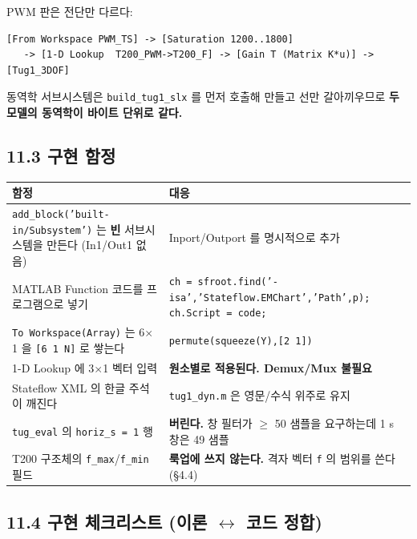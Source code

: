 \documentclass[10pt,a4paper]{article}
\begin{document}
PWM 판은 전단만 다르다:

\begin{Verbatim}[fontsize=\small,frame=single,framesep=2.2mm,rulecolor=\color{black!35}]
[From Workspace PWM_TS] -> [Saturation 1200..1800]
   -> [1-D Lookup  T200_PWM->T200_F] -> [Gain T (Matrix K*u)] -> [Tug1_3DOF]
\end{Verbatim}

동역학 서브시스템은 \texttt{build\_tug1\_slx} 를 먼저 호출해 만들고 선만 갈아끼우므로 \textbf{두 모델의 동역학이 바이트 단위로 같다.}

\subsection*{11.3 구현 함정}

\begin{center}\footnotesize\setlength{\tabcolsep}{3pt}
\begin{tabular}{@{}p{7.58cm}p{7.48cm}@{}}
\toprule
\textbf{함정} & \textbf{대응} \\
\midrule
\texttt{add\_block('built-in/\discretionary{}{}{}Subsystem')} 는 \textbf{빈} 서브시스템을 만든다 (In1/Out1 없음) & Inport/Outport 를 명시적으로 추가 \\
MATLAB Function 코드를 프로그램으로 넣기 & \texttt{ch = sfroot.find('-isa',\discretionary{}{}{}'Stateflow.EMChart',\discretionary{}{}{}'Path',\discretionary{}{}{}p)\discretionary{}{}{}; ch.Script = code;} \\
\texttt{To Workspace(Array)} 는 6$\times$1 을 \texttt{[6 1 N]} 로 쌓는다 & \texttt{permute(squeeze(Y),[2 1])} \\
1-D Lookup 에 3$\times$1 벡터 입력 & \textbf{원소별로 적용된다. Demux/Mux 불필요} \\
Stateflow XML 의 한글 주석이 깨진다 & \texttt{tug1\_dyn.m} 은 영문/수식 위주로 유지 \\
\texttt{tug\_eval} 의 \texttt{horiz\_s = 1} 행 & \textbf{버린다.} 창 필터가 $\geq$ 50 샘플을 요구하는데 1 s 창은 49 샘플 \\
T200 구조체의 \texttt{f\_max}/\texttt{f\_min} 필드 & \textbf{룩업에 쓰지 않는다.} 격자 벡터 \texttt{f} 의 범위를 쓴다 (\S{}4.4) \\
\bottomrule
\end{tabular}
\end{center}

\subsection*{11.4 구현 체크리스트 (이론 $\leftrightarrow$ 코드 정합)}
\end{document}
